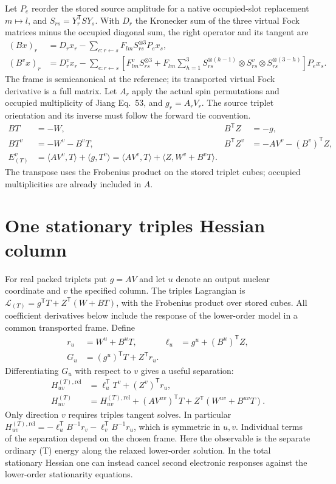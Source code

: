 \documentclass[11pt]{article}
\begin{document}
Let $P_e$ reorder the stored source amplitude for a native occupied-slot
replacement $m\mapsto l$, and $S_{rs}=Y_r^{\mathsf T} S Y_s$.
With $D_r$ the Kronecker sum of the three virtual Fock matrices minus
the occupied diagonal sum, the right operator and its tangent are
\begin{align}
 (Bx)_r&=D_r x_r-\sum_{e:r\leftarrow s} F_{lm} S_{rs}^{\otimes3}P_e x_s,\\
 (B^v x)_r&=D_r^v x_r-\sum_{e:r\leftarrow s}
 \left[F_{lm}^v S_{rs}^{\otimes3}
 +F_{lm}\sum_{h=1}^3 S_{rs}^{\otimes(h-1)}\otimes S_{rs}^v
                         \otimes S_{rs}^{\otimes(3-h)}\right]P_e x_s .
\end{align}
The frame is semicanonical at the reference; its transported virtual Fock
derivative is a full matrix. Let $A_r$ apply the actual spin permutations
and occupied multiplicity of Jiang Eq.~53, and $g_r=A_r V_r$. The source
triplet orientation and its inverse must follow the forward tie convention.
\begin{align}
 BT&=-W,& B^{\mathsf T}Z&=-g,\\
 BT^v&=-W^v-B^vT,& B^{\mathsf T}Z^v&=-A V^v-(B^v)^{\mathsf T}Z,\\
 E_{(T)}^v&=\langle A V^v,T\rangle+\langle g,T^v\rangle
          =\langle A V^v,T\rangle+\langle Z,W^v+B^vT\rangle .
\end{align}
The transpose uses the Frobenius product on the stored triplet cubes;
occupied multiplicities are already included in $A$.
\section{One stationary triples Hessian column}
For real packed triplets put $g=A V$ and let $u$ denote an output nuclear
coordinate and $v$ the specified column. The triples Lagrangian is
$\mathcal L_{(T)}=g^{\mathsf T}T+Z^{\mathsf T}(W+BT)$, with the Frobenius
product over stored cubes. All coefficient derivatives below include the
response of the lower-order model in a common transported frame. Define
\begin{align}
 r_u &= W^u+B^uT, & \ell_u &= g^u+(B^u)^{\mathsf T}Z,\\
 G_u &= (g^u)^{\mathsf T}T+Z^{\mathsf T}r_u .
\end{align}
Differentiating $G_u$ with respect to $v$ gives a useful separation:
\begin{align}
 H_{uv}^{(T),\mathrm{rel}} &= \ell_u^{\mathsf T}T^v+(Z^v)^{\mathsf T}r_u,\\
 H_{uv}^{(T)} &= H_{uv}^{(T),\mathrm{rel}}
       +(A V^{uv})^{\mathsf T}T+Z^{\mathsf T}(W^{uv}+B^{uv}T).
\end{align}
Only direction $v$ requires triples tangent solves. In particular
$H_{uv}^{(T),\mathrm{rel}}=-\ell_u^{\mathsf T}B^{-1}r_v
-\ell_v^{\mathsf T}B^{-1}r_u$, which is symmetric in $u,v$. Individual
terms of the separation depend on the chosen frame.
Here the observable is the separate ordinary (T) energy along the relaxed
lower-order solution. In the total stationary Hessian one can instead cancel
second electronic responses against the lower-order stationarity equations.
\end{document}
